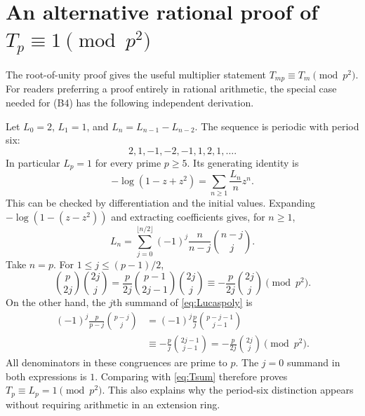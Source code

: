 \documentclass[11pt,a4paper]{article}
\numberwithin{equation}{section}
\theoremstyle{definition}
\theoremstyle{remark}
\begin{document}
\clearpage
\appendix
\section{An alternative rational proof of \texorpdfstring{$T_p\equiv1\pmod{p^2}$}{the scalar congruence}}
\label{app:rational}
The root-of-unity proof gives the useful multiplier statement
$T_{mp}\equiv T_m\pmod{p^2}$. For readers preferring a proof entirely
in rational arithmetic, the special case needed for (B4) has the
following independent derivation.

Let $L_0=2$, $L_1=1$, and $L_n=L_{n-1}-L_{n-2}$. The sequence is
periodic with period six:
\[
 2,1,-1,-2,-1,1,2,1,\ldots.
\]
In particular $L_p=1$ for every prime $p\geq5$. Its generating
identity is
\[
 -\log(1-z+z^2)=\sum_{n\geq1}\frac{L_n}{n}z^n.
\]
This can be checked by differentiation and the initial values. Expanding
$-\log(1-(z-z^2))$ and extracting coefficients gives, for $n\geq1$,
\begin{equation}\label{eq:Lucaspoly}
 L_n=\sum_{j=0}^{\lfloor n/2\rfloor}
 (-1)^j\frac{n}{n-j}\binom{n-j}{j}.
\end{equation}
Take $n=p$. For $1\leq j\leq(p-1)/2$,
\[
 \binom p{2j}\binom{2j}j
 =\frac p{2j}\binom{p-1}{2j-1}\binom{2j}j
 \equiv-\frac p{2j}\binom{2j}j\pmod{p^2}.
\]
On the other hand, the $j$th summand of \eqref{eq:Lucaspoly} is
\begin{align*}
 (-1)^j\frac p{p-j}\binom{p-j}j
 &=(-1)^j\frac pj\binom{p-j-1}{j-1}\\
 &\equiv-\frac pj\binom{2j-1}{j-1}
 =-\frac p{2j}\binom{2j}j\pmod{p^2}.
\end{align*}
All denominators in these congruences are prime to $p$. The $j=0$
summand in both expressions is $1$. Comparing with \eqref{eq:Tsum}
therefore proves $T_p\equiv L_p=1\pmod{p^2}$. This also explains
why the period-six distinction appears without requiring arithmetic in
an extension ring.
\end{document}
